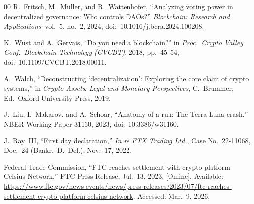\documentclass[conference]{IEEEtran}
\begin{document}
\begin{thebibliography}{00}
 R.~Fritsch, M.~M\"uller, and R.~Wattenhofer, ``Analyzing voting power in decentralized governance: Who controls DAOs?'' \textit{Blockchain: Research and Applications}, vol.~5, no.~2, 2024, doi:~10.1016/j.bcra.2024.100208.

 K.~W\"ust and A.~Gervais, ``Do you need a blockchain?'' in \textit{Proc.\ Crypto Valley Conf.\ Blockchain Technology (CVCBT)}, 2018, pp.\ 45--54, doi:~10.1109/CVCBT.2018.00011.

 A.~Walch, ``Deconstructing `decentralization': Exploring the core claim of crypto systems,'' in \textit{Crypto Assets: Legal and Monetary Perspectives}, C.~Brummer, Ed.\ Oxford University Press, 2019.

 J.~Liu, I.~Makarov, and A.~Schoar, ``Anatomy of a run: The Terra Luna crash,'' NBER Working Paper 31160, 2023, doi:~10.3386/w31160.

 J.~Ray~III, ``First day declaration,'' \textit{In re FTX Trading Ltd.}, Case No.\ 22-11068, Doc.\ 24 (Bankr.\ D.\ Del.), Nov.\ 17, 2022.

 Federal Trade Commission, ``FTC reaches settlement with crypto platform Celsius Network,'' FTC Press Release, Jul.\ 13, 2023. [Online]. Available: \url{https://www.ftc.gov/news-events/news/press-releases/2023/07/ftc-reaches-settlement-crypto-platform-celsius-network}. Accessed: Mar.\ 9, 2026.

\end{thebibliography}
\end{document}
